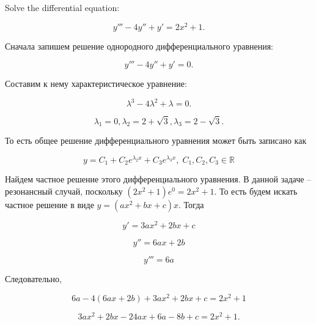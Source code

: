 \documentclass[addpoints]{exam} %
\newcommand{\RR}{\mathbb{R}}
\begin{document}
\begin{questions}

\question Solve the  differential equation:

\[
y''' -4y'' +y' =2x^{2} +1.
\]

\begin{solution}
Сначала запишем решение однородного дифференциального уравнения:

\[y''' -4y'' +y' =0.\]

Составим к нему характеристическое уравнение:

  \[\lambda ^{3} -4\lambda ^{2} +\lambda =0.\]

  \[\lambda _{1} =0,\lambda _{2} =2 + \sqrt{3},\lambda _{3} =2 - \sqrt{3}.\]

  То есть общее решение дифференциального уравнения может быть записано как

  \[y=C_{1} +C_{2} e^{\lambda_2 x} +C_{3} e^{\lambda_3 x},\; C_{1} ,C_{2} ,C_{3} \in \RR \]

  Найдем частное решение этого дифференциального уравнения. В данной задаче -- резонансный случай, поскольку $\left(2x^{2} +1\right)e^{0} =2x^{2} +1$. То есть будем искать частное решение в виде $y=(ax^{2} +bx+c)x$. Тогда

  \[y' =3ax^{2} +2bx+c\]

  \[y'' =6ax+2b\]

  \[y''' =6a\]

  Следовательно,

  \[6a-4(6ax+2b)+3ax^{2} +2bx+c=2x^{2} +1\]

  \[3ax^{2} +2bx-24ax+6a-8b+c=2x^{2} +1.\]


\end{solution}
\end{questions}
\end{document}
